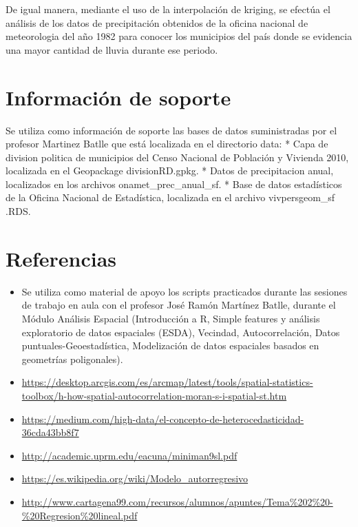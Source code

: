 \documentclass[11pt,]{article}
\providecommand{\tightlist}{%
\setlength{\itemsep}{0pt}\setlength{\parskip}{0pt}}
\begin{document}
De igual manera, mediante el uso de la interpolación de kriging, se
efectúa el análisis de los datos de precipitación obtenidos de la
oficina nacional de meteorologia del año 1982 para conocer los
municipios del país donde se evidencia una mayor cantidad de lluvia
durante ese periodo.

\section{Información de soporte}\label{informaciuxf3n-de-soporte}

Se utiliza como información de soporte las bases de datos suministradas
por el profesor Martinez Batlle que está localizada en el directorio
data: * Capa de division politica de municipios del Censo Nacional de
Población y Vivienda 2010, localizada en el Geopackage divisionRD.gpkg.
* Datos de precipitacion anual, localizados en los archivos
onamet\_prec\_anual\_sf. * Base de datos estadísticos de la Oficina
Nacional de Estadística, localizada en el archivo vivpersgeom\_sf .RDS.

\section{Referencias}\label{referencias}

\begin{itemize}
\tightlist
\item
  Se utiliza como material de apoyo los scripts practicados durante las
  sesiones de trabajo en aula con el profesor José Ramón Martínez
  Batlle, durante el Módulo Análisis Espacial (Introducción a R, Simple
  features y análisis exploratorio de datos espaciales (ESDA), Vecindad,
  Autocorrelación, Datos puntuales-Geoestadística, Modelización de datos
  espaciales basados en geometrías poligonales).
\item
  \url{https://desktop.arcgis.com/es/arcmap/latest/tools/spatial-statistics-toolbox/h-how-spatial-autocorrelation-moran-s-i-spatial-st.htm}
\item
  \url{https://medium.com/high-data/el-concepto-de-heterocedasticidad-36cda43bb8f7}
\item
  \url{http://academic.uprm.edu/eacuna/miniman9sl.pdf}
\item
  \url{https://es.wikipedia.org/wiki/Modelo_autorregresivo}
\item
  \url{http://www.cartagena99.com/recursos/alumnos/apuntes/Tema\%202\%20-\%20Regresion\%20lineal.pdf}
\end{itemize}
\end{document}
